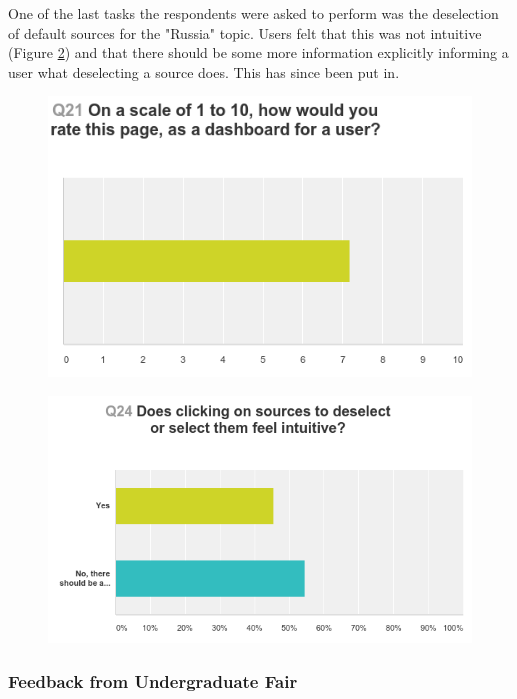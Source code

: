 \documentclass[12pt]{article}
\begin{document}
One of the last tasks the respondents were asked to perform was the deselection of default sources for the "Russia" topic. Users felt that this was not intuitive (Figure \ref{ui7}) and that there should be some more information explicitly informing a user what deselecting a source does. This has since been put in.

\begin{figure}[ht!]
  \centering
    \includegraphics[scale=0.5]{ui6.png}
   \caption[A graph depicting responses to the User Interface Survey]{}
   \label{ui6}
\end{figure} 

\begin{figure}[ht!]
  \centering
    \includegraphics[scale=0.5]{ui7.png}
   \caption[A graph depicting responses to the User Interface Survey]{}
   \label{ui7}
\end{figure} 

\subsubsection{Feedback from Undergraduate Fair}
\end{document}
